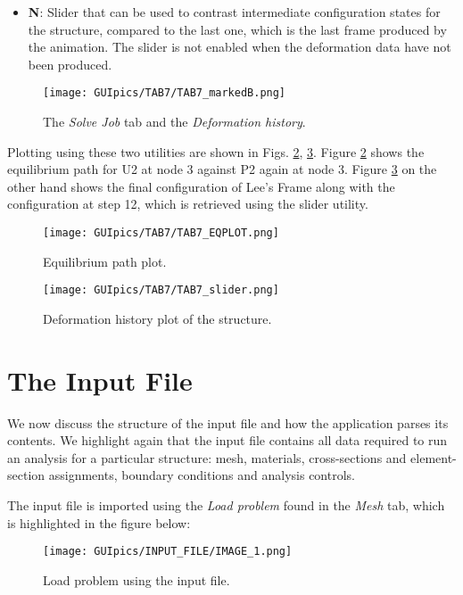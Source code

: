 \begin{appendices}
\begin{itemize}
	\item \textbf{N}: Slider that can be used to contrast intermediate 
	configuration states for the structure, compared to the last one, which is 
	the last frame produced by the animation. The slider is not enabled when 
	the deformation data have not been produced. 
\end{itemize}

\begin{figure}
	\centering
	\texttt{[image: GUIpics/TAB7/TAB7\_markedB.png]}
	\caption{The \textit{Solve Job} tab and the \textit{Deformation history}.}
	\label{fig:TAB7_markedB}
\end{figure}

Plotting using these two utilities are shown in Figs. \ref{fig:TAB7_EQPLOT}, 
\ref{fig:TAB7_slider}. Figure \ref{fig:TAB7_EQPLOT} shows the equilibrium path 
for U2 at node 3 against P2 again at node 3. Figure \ref{fig:TAB7_slider} on 
the other hand shows the final configuration of Lee's Frame along with the 
configuration at step 12, which is retrieved using the slider utility.

\begin{figure}
	\centering
	\texttt{[image: GUIpics/TAB7/TAB7\_EQPLOT.png]}
	\caption{Equilibrium path plot.}
	\label{fig:TAB7_EQPLOT}
\end{figure}

\begin{figure}
	\centering
	\texttt{[image: GUIpics/TAB7/TAB7\_slider.png]}
	\caption{Deformation history plot of the structure.}
	\label{fig:TAB7_slider}
\end{figure}

\section*{The Input File}\label{INPUTFILE}

We now discuss the structure of the input file and how the application parses 
its contents. We highlight again that the input file contains all data required 
to run an analysis for a particular structure: mesh, materials, cross-sections 
and element-section assignments, boundary conditions and analysis controls.

The input file is imported using the \textit{Load problem} found in the 
\textit{Mesh} tab, which is highlighted in the figure below:

\begin{figure}
	\centering
	\texttt{[image: GUIpics/INPUT\_FILE/IMAGE\_1.png]}
	\caption{Load problem using the input file.}
	\label{fig:IMAGE_1}
\end{figure}


\end{appendices}
